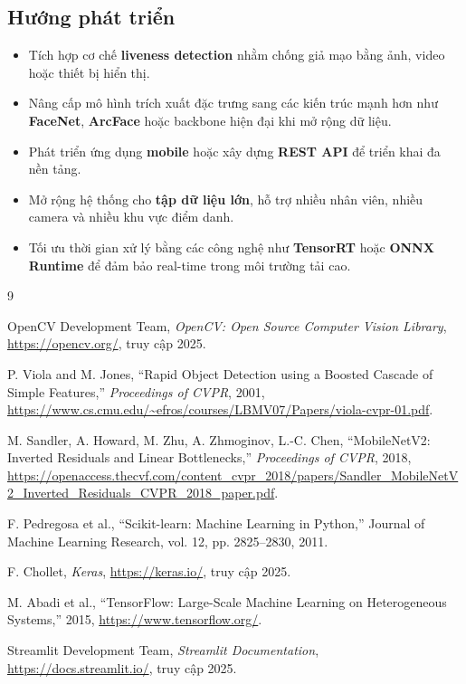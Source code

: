 \documentclass[a4paper]{book}
\begin{document}
\subsection*{Hướng phát triển}
\begin{itemize}
    \item Tích hợp cơ chế \textbf{liveness detection} nhằm chống giả mạo bằng ảnh, video hoặc thiết bị hiển thị.
    \item Nâng cấp mô hình trích xuất đặc trưng sang các kiến trúc mạnh hơn như \textbf{FaceNet}, \textbf{ArcFace} hoặc backbone hiện đại khi mở rộng dữ liệu.
    \item Phát triển ứng dụng \textbf{mobile} hoặc xây dựng \textbf{REST API} để triển khai đa nền tảng.
    \item Mở rộng hệ thống cho \textbf{tập dữ liệu lớn}, hỗ trợ nhiều nhân viên, nhiều camera và nhiều khu vực điểm danh.
    \item Tối ưu thời gian xử lý bằng các công nghệ như \textbf{TensorRT} hoặc \textbf{ONNX Runtime} để đảm bảo real-time trong môi trường tải cao.
\end{itemize}


\begin{thebibliography}{9}

 OpenCV Development Team, \emph{OpenCV: Open Source Computer Vision Library}, \url{https://opencv.org/}, truy cập 2025.

 P. Viola and M. Jones, ``Rapid Object Detection using a Boosted Cascade of Simple Features,'' \emph{Proceedings of CVPR}, 2001, \url{https://www.cs.cmu.edu/~efros/courses/LBMV07/Papers/viola-cvpr-01.pdf}.

 M. Sandler, A. Howard, M. Zhu, A. Zhmoginov, L.-C. Chen, ``MobileNetV2: Inverted Residuals and Linear Bottlenecks,'' \emph{Proceedings of CVPR}, 2018, \url{https://openaccess.thecvf.com/content_cvpr_2018/papers/Sandler_MobileNetV2_Inverted_Residuals_CVPR_2018_paper.pdf}.

F. Pedregosa et al., “Scikit-learn: Machine Learning in Python,” Journal of Machine Learning Research, vol. 12, pp. 2825–2830, 2011.

 F. Chollet, \emph{Keras}, \url{https://keras.io/}, truy cập 2025.

 M. Abadi et al., ``TensorFlow: Large-Scale Machine Learning on Heterogeneous Systems,'' 2015, \url{https://www.tensorflow.org/}.

 Streamlit Development Team, \emph{Streamlit Documentation}, \url{https://docs.streamlit.io/}, truy cập 2025.

\end{thebibliography}
\end{document}
